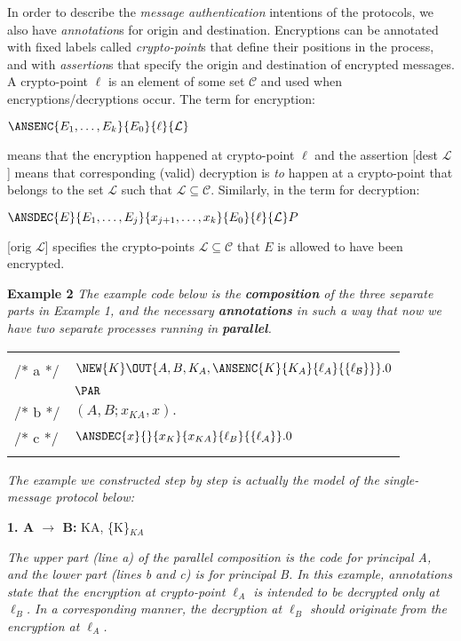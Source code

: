 In order to describe the \emph{message authentication} intentions of the protocols, we also have \emph{annotation}s for origin and destination.
Encryptions can be annotated with fixed labels called \textit{crypto-point}s that define their positions in the process, 
and with \textit{assertion}s that specify the origin and destination of encrypted messages.
A crypto-point \(\ell\) is an element of some set \(\mathcal{C}\) and used when encryptions/decryptions occur. 
The \LYSA term for encryption:
\begin{center} $\ANSENC{E_1,\ldots,E_k}{E_0}{\ell}{\mathcal{L}}$ \end{center}
means that the encryption happened at crypto-point \(\ell\) and the assertion [dest \(\mathcal{L}\)] means that 
corresponding (valid) decryption is \emph{to} happen at a crypto-point that belongs to the set $\mathcal{L}$ such that \(\mathcal{L} \subseteq \mathcal{C}\).
Similarly, in the \LYSA term for decryption:
\begin{center} $\ANSDEC{E}{E_1,\ldots,E_j}{x_{j+1},\ldots,x_k}{E_0}{\ell}{\mathcal{L}} P$ \end{center}
[orig \(\mathcal{L}\)] specifies the crypto-points \(\mathcal{L} \subseteq \mathcal{C}\) that $E$ is allowed to have been encrypted.

\textbf{Example 2}  \textit{The example \LYSA code below is the \textbf{composition} of the three separate parts in Example 1, and the necessary \textbf{annotations} in such a way that now we have two separate processes running in \textbf{parallel}.}

\begin{tabular}{ll}
         & \\
/* a */  & $\NEW{K}\OUT{A,B, K_A, \ANSENC{K}{K_A}{\ell_A}{\{\mathcal{\ell_B}\}} }.0$ \\
         & $\PAR$ \\
/* b */  & $(A, B ; x_{KA}, x).$ \\
/* c */  & $\ANSDEC{x}{}{x_K}{x_{KA}}{\ell_B}{\{\mathcal{\ell_A}\}}.0$ \\
         & \\
\end{tabular}

\textit{The example we constructed step by step is actually the \LYSA model of the single-message protocol below:}
\begin{center} \textbf{1. A \(\rightarrow\) B:} KA, \{K\}$_{KA}$ \end{center}
\textit{The upper part (line a) of the parallel composition is the code for principal A, and the lower part (lines b and c) is for principal B. In this example, annotations state that the encryption at crypto-point $\ell_A$ is intended to be decrypted only at $\ell_B$. In a corresponding manner, the decryption at $\ell_B$ should originate from the encryption at $\ell_A$.}

